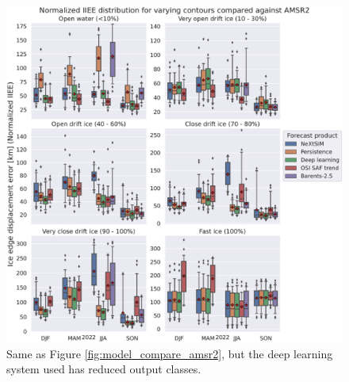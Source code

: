 \documentclass[../main/thesis.tex]{subfiles}
\begin{document}
\begin{figure}
    \centering
    \includegraphics[width=\textwidth]{model_intercomparisson_amsr2_reduced.pdf}
    \caption{\label{fig:model_compare_amsr2_reduced}Same as Figure \ref{fig:model_compare_amsr2}, but the deep learning system used has reduced output classes.}
\end{figure}

\biblio
\end{document}
